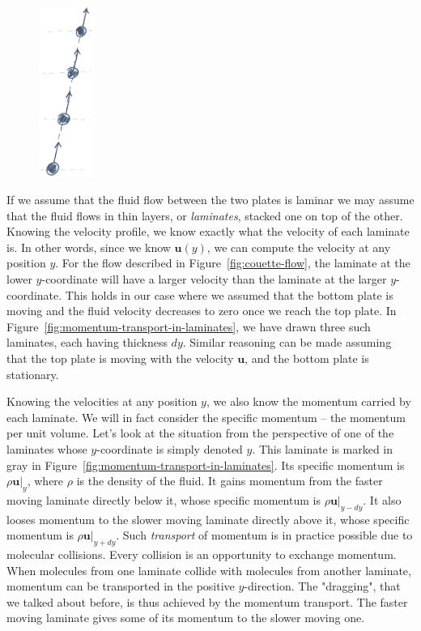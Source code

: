 \documentclass[10pt,twocolumn]{article}
\begin{document}
\begin{figure}
\centering\includegraphics[width=1.8cm]{molecular-collisions.png}
\label{fig:molecular-collisions}
\end{figure}
If we assume that the fluid flow between the two plates is laminar we may assume that the fluid flows in thin layers, or \textit{laminates}, stacked one on top of the other. Knowing the velocity profile, we know exactly what the velocity of each laminate is. In other words, since we know $\mathbf{u}(y)$, we can compute the velocity at any position $y$. For the flow described in Figure~\ref{fig:couette-flow}, the laminate at the lower $y$-coordinate will have a larger velocity than the laminate at the larger $y$-coordinate. This holds in our case where we assumed that the bottom plate is moving and the fluid velocity decreases to zero once we reach the top plate. In Figure~\ref{fig:momentum-transport-in-laminates}, we have drawn three such laminates, each having thickness $dy$. Similar reasoning can be made assuming that the top plate is moving with the velocity $\mathbf{u}$, and the bottom plate is stationary.

Knowing the velocities at any position $y$, we also know the momentum carried by each laminate. We will in fact consider the specific momentum -- the momentum per unit volume. Let's look at the situation from the perspective of one of the laminates whose $y$-coordinate is simply denoted $y$. This laminate is marked in gray in Figure~\ref{fig:momentum-transport-in-laminates}. Its specific momentum is $\rho \mathbf{u}|_{y}$, where $\rho$ is the density of the fluid.  It gains momentum from the faster moving laminate directly below it, whose specific momentum is $\rho \mathbf{u}|_{y-dy}$. It also looses momentum to the slower moving laminate directly above it, whose specific momentum is $\rho \mathbf{u}|_{y+dy}$. Such \textit{transport} of momentum is in practice possible due to molecular collisions. Every collision is an opportunity to exchange momentum. When molecules from one laminate collide with molecules from another laminate, momentum can be transported in the positive $y$-direction. The "dragging", that we talked about before, is thus achieved by the momentum transport. The faster moving laminate gives some of its momentum to the slower moving one.
\end{document}
